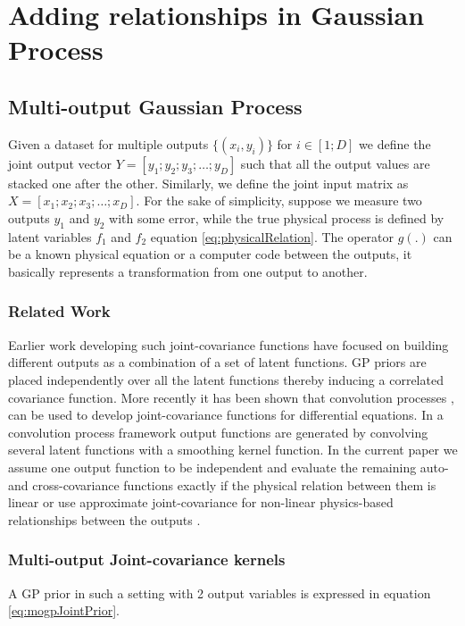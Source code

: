 \chapter{Adding relationships in Gaussian Process}
\label{chapAddingEquationsInGP}

\section{Multi-output Gaussian Process}\label{sec:mogp}

\noindent Given a dataset for multiple outputs \(\{(x_{i}, y_{i})\}\) for \(i \in [1; D]\) we define the joint output vector \(Y = [y_{1}; y_{2}; y_{3}; \ldots; y_{D}]\) such that all the output values are stacked one after the other. Similarly, we define the joint input matrix as \(X = [x_{1}; x_{2}; x_{3}; \ldots; x_{D}]\). For the sake of simplicity, suppose we measure two outputs  \(y_{1}\) and \(y_{2}\) with some error, while the true physical process is defined by latent variables \(f_{1}\) and \(f_{2}\) equation \ref{eq:physicalRelation}. The operator \(g(.)\) can be a known physical equation or a computer code between the outputs, it basically represents a transformation from one output to another. 

\subsection{Related Work}\label{subsec:MOGPrelatedWork}
Earlier work developing such joint-covariance functions \cite{bonilla_multi-task_2008} have focused on  building different outputs as a combination of a set of latent functions. GP priors are placed independently over all the latent functions thereby inducing a correlated covariance function. More recently it has been shown that convolution processes \cite{journals/jmlr/AlvarezLL09} ,   \cite{Boyle05dependentgaussian} can be used to develop joint-covariance functions for differential equations. In a convolution process framework output functions are generated by convolving several latent functions with a smoothing kernel function. In the current paper we assume one output function to be independent and evaluate the remaining auto- and cross-covariance functions exactly if the physical relation between them is linear \cite{NIPSDerivativeGP} or use approximate joint-covariance for non-linear physics-based relationships between the outputs \cite{Constantinescu2013}.

\subsection{Multi-output Joint-covariance kernels}\label{sub:MOGPs}
A GP prior in such a setting with 2 output variables is expressed in equation \ref{eq:mogpJointPrior}.  


